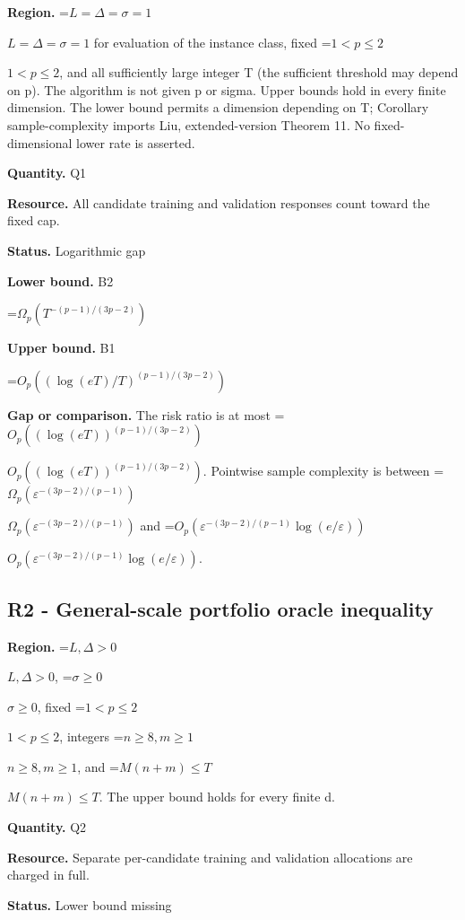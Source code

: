 \documentclass[10pt,a4paper]{article}
\newcommand{\AtlasMath}[1]{\par\begingroup\centering\setbox0=\hbox{$\displaystyle #1$}\ifdim\wd0>1.4\linewidth\typeout{ATLAS WIDE FORMULA: \the\wd0}\fi\ifdim\wd0>\linewidth\resizebox{\linewidth}{!}{\box0}\else\box0\fi\par\endgroup}
\newcommand{\AtlasInlineMath}[1]{\begingroup\setbox0=\hbox{$#1$}\ifdim\wd0>.4\linewidth\endgroup\AtlasMath{#1}\else\endgroup$#1$\fi}
\begin{document}
\textbf{Region.} \AtlasInlineMath{L=\Delta=\sigma=1} for evaluation of the instance class, fixed \AtlasInlineMath{1<p\le2}, and all sufficiently large integer T (the sufficient threshold may depend on p). The algorithm is not given p or sigma. Upper bounds hold in every finite dimension. The lower bound permits a dimension depending on T; Corollary sample-complexity imports Liu, extended-version Theorem 11. No fixed-dimensional lower rate is asserted.



\textbf{Quantity.} Q1



\textbf{Resource.} All candidate training and validation responses count toward the fixed cap.



\textbf{Status.} Logarithmic gap



\textbf{Lower bound.} B2



\AtlasMath{\Omega_p\!\left(T^{-(p-1)/(3p-2)}\right)}


\textbf{Upper bound.} B1



\AtlasMath{O_p\!\left((\log(eT)/T)^{(p-1)/(3p-2)}\right)}


\textbf{Gap or comparison.} The risk ratio is at most \AtlasInlineMath{O_p((\log(eT))^{(p-1)/(3p-2)})}. Pointwise sample complexity is between \AtlasInlineMath{\Omega_p(\varepsilon^{-(3p-2)/(p-1)})} and \AtlasInlineMath{O_p(\varepsilon^{-(3p-2)/(p-1)}\log(e/\varepsilon))}.



\subsection{R2 - General-scale portfolio oracle inequality}


\textbf{Region.} \AtlasInlineMath{L,\Delta>0}, \AtlasInlineMath{\sigma\ge0}, fixed \AtlasInlineMath{1<p\le2}, integers \AtlasInlineMath{n\ge8,m\ge1}, and \AtlasInlineMath{M(n+m)\le T}. The upper bound holds for every finite d.



\textbf{Quantity.} Q2



\textbf{Resource.} Separate per-candidate training and validation allocations are charged in full.



\textbf{Status.} Lower bound missing
\end{document}
